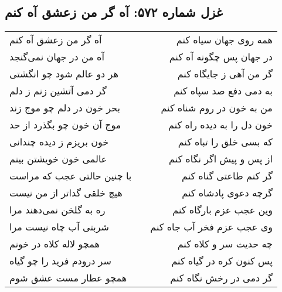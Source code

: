 \begin{center}
\section*{غزل شماره ۵۷۲: آه گر من زعشق آه کنم}
\label{sec:572}
\begin{longtable}{l p{0.5cm} r}
آه گر من زعشق آه کنم
&&
همه روی جهان سیاه کنم
\\
آه من در جهان نمی‌گنجد
&&
در جهان پس چگونه آه کنم
\\
هر دو عالم شود چو انگشتی
&&
گر من آهی ز جایگاه کنم
\\
گر دمی آتشین زنم ز دلم
&&
به دمی دفع صد سپاه کنم
\\
بحر خون در دلم چو موج زند
&&
من به خون در روم شناه کنم
\\
موج آن خون چو بگذرد از حد
&&
خون دل را به دیده راه کنم
\\
خون بریزم ز دیده چندانی
&&
که بسی خلق را تباه کنم
\\
عالمی خون خویشتن بینم
&&
از پس و پیش اگر نگاه کنم
\\
با چنین حالتی عجب که مراست
&&
گر کنم طاعتی گناه کنم
\\
هیچ خلقی گداتر از من نیست
&&
گرچه دعوی پادشاه کنم
\\
ره به گلخن نمی‌دهند مرا
&&
وین عجب عزم بارگاه کنم
\\
شربتی آب چاه نیست مرا
&&
وی عجب عزم فخر آب جاه کنم
\\
همچو لاله کلاه در خونم
&&
چه حدیث سر و کلاه کنم
\\
سر درودم فرید را چو گیاه
&&
پس کنون کره در گیاه کنم
\\
همچو عطار مست عشق شوم
&&
گر دمی در رخش نگاه کنم
\\
\end{longtable}
\end{center}
